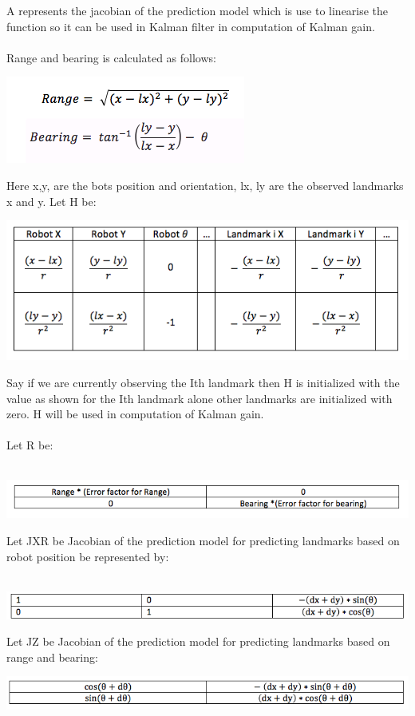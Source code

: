 \documentclass[12pt]{article}
\begin{document}
A represents the jacobian of the prediction model which is use to linearise the function so it can be used in Kalman filter in computation of Kalman gain\cite{filter}.\\
\\
Range and bearing is calculated as follows:
\begin{center} \includegraphics[scale=0.4]{t6} \end{center}
Here x,y, are the bots position and orientation, lx, ly are the observed landmarks x and y. Let H be:\\
\begin{center} \includegraphics[scale=0.4]{t7} \end{center}
Say if we are currently observing the Ith landmark then H is initialized with the value as shown for the Ith landmark alone other landmarks are initialized with zero. H will be used in computation of Kalman gain.\\
\\
Let R be:\\
\\
\begin{center} \includegraphics[scale=0.4]{t8} \end{center}
Let JXR be Jacobian of the prediction model for predicting landmarks based on robot position be represented by:\\
\\
\begin{center} \includegraphics[scale=0.4]{t9} \end{center}
Let JZ be Jacobian of the prediction model for predicting landmarks based on range and bearing:\begin{center} \includegraphics[scale=0.4]{t10} \end{center}
\end{document}
